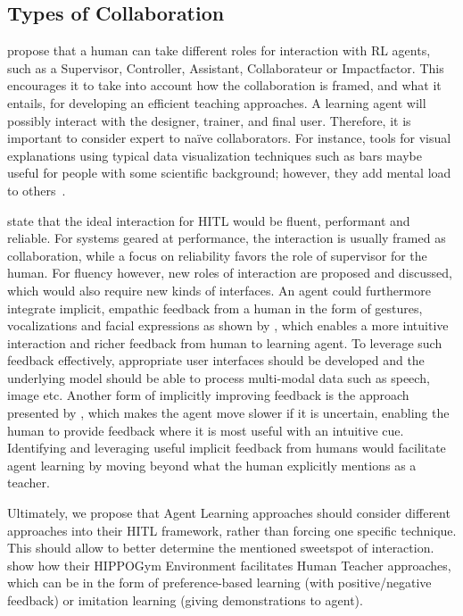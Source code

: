 \documentclass[twoside,11pt]{article}
\begin{document}
\begin{enumerate}
\subsection{Types of Collaboration}

\citet{WuEtAl:2021:HITLMLSurvey} propose that a human can take different roles for interaction with RL agents, such as a Supervisor, Controller, Assistant, Collaborateur or Impactfactor. This encourages it to take into account how the collaboration is framed, and what it entails, for developing an efficient teaching approaches. A learning agent will possibly interact with the designer, trainer, and final user. Therefore, it is important to consider expert to na\"ive collaborators. For instance, tools for visual explanations using typical data visualization techniques such as bars maybe useful for people with some scientific background; however, they add mental load to others~\citep{anderson:20}. 
 
\citet{WuEtAl:2021:HITLMLSurvey} state that the ideal interaction for HITL would be fluent, performant and reliable. For systems geared at performance, the interaction is usually framed as collaboration, while a focus on reliability favors the role of supervisor for the human. For fluency however, new roles of interaction are proposed and discussed, which would also require new kinds of interfaces. An agent could furthermore integrate implicit, empathic feedback from a human in the form of gestures, vocalizations and facial expressions as shown by \citet{CuiEtAl:2020:EMPATHICFrameworkHumanFeedback}, which enables a more intuitive interaction and richer feedback from human to learning agent. To leverage such feedback effectively, appropriate user interfaces should be developed and the underlying model should be able to process multi-modal data such as speech, image etc. Another form of implicitly improving feedback is the approach presented by \citet{PengEtAl:2016:AdaptingAgentSpeed}, which makes the agent move slower if it is uncertain, enabling the human to provide feedback where it is most useful with an intuitive cue. Identifying and leveraging useful implicit feedback from humans would facilitate agent learning by moving beyond what the human explicitly mentions as a teacher.

Ultimately, we propose that Agent Learning approaches should consider different approaches into their HITL framework, rather than forcing one specific technique. This should allow to better determine the mentioned sweetspot of interaction. \citet{WuEtAl:2021:HITLMLSurvey} show how their HIPPOGym Environment facilitates Human Teacher approaches, which can be in the form of preference-based learning (with positive/negative feedback) or imitation learning (giving demonstrations to agent).\\


\end{enumerate}
\end{document}
